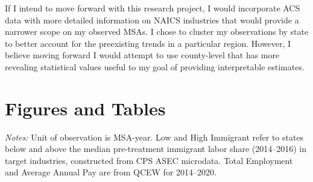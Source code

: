 \documentclass[12pt]{article}
\begin{document}
If I intend to move forward with this research project, I would incorporate ACS data with more detailed information on NAICS industries that would provide a narrower scope on my observed MSAs. I chose to cluster my observations by state to better account for the preexisting trends in a particular region. However, I believe moving forward I would attempt to use county-level that has more revealing statistical values useful to my goal of providing interpretable estimates. 
 

\newpage

 
\newpage
\section*{Figures and Tables}

\begin{table}[h]
\centering
\caption{Summary Statistics by Treatment Group}
\begin{minipage}{\textwidth}
\vspace{6pt}
\small\textit{Notes:} Unit of observation is MSA-year. Low and High Immigrant refer to states below and above the median pre-treatment immigrant labor share (2014--2016) in target industries, constructed from CPS ASEC microdata. Total Employment and Average Annual Pay are from QCEW for 2014--2020.
\end{minipage}
\end{table}
\end{document}
